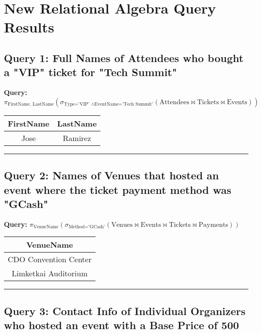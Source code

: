 \documentclass{article}
\begin{document}
\section*{New Relational Algebra Query Results}

\subsection*{Query 1: Full Names of Attendees who bought a "VIP" ticket for "Tech Summit"}

\noindent \textbf{Query:} $\pi_{\text{FirstName, LastName}} \left( \sigma_{\text{Type='VIP' } \land \text{EventName='Tech Summit'}} \left( \text{Attendees} \bowtie \text{Tickets} \bowtie \text{Events} \right) \right)$

\begin{center}
\begin{tabular}{cc}
\toprule
\textbf{FirstName} & \textbf{LastName} \\
\midrule
Jose & Ramirez \\
\bottomrule
\end{tabular}
\end{center}

\hrule

\subsection*{Query 2: Names of Venues that hosted an event where the ticket payment method was "GCash"}

\noindent \textbf{Query:} $\pi_{\text{VenueName}} \left( \sigma_{\text{Method='GCash'}} \left( \text{Venues} \bowtie \text{Events} \bowtie \text{Tickets} \bowtie \text{Payments} \right) \right)$

\begin{center}
\begin{tabular}{c}
\toprule
\textbf{VenueName} \\
\midrule
CDO Convention Center \\
Limketkai Auditorium \\
\bottomrule
\end{tabular}
\end{center}

\hrule

\subsection*{Query 3: Contact Info of Individual Organizers who hosted an event with a Base Price of 500}
\end{document}
